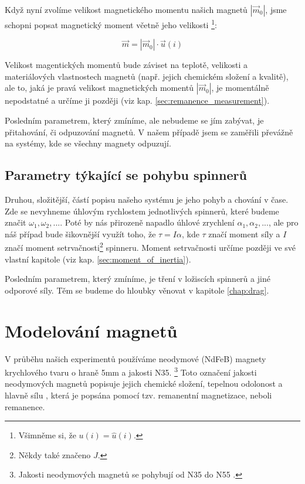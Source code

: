 \documentclass[12pt, a4paper,
 twoside,        %
 openright
]{report}
\begin{document}
{\raggedright
Když nyní zvolíme velikost magnetického momentu našich magnetů $|\vec{m}_0|$, jsme schopni popsat magnetický moment včetně jeho velikosti \footnote{Všimněme si, že $u(i) = \hat{u}(i)$.}:}

\begin{equation}
    \label{eq:magnet_moment_orientation}
    \vec{m} = |\vec{m}_0| \cdot \vec{u}(i)
\end{equation}

Velikost magentických momentů bude záviset na teplotě, velikosti a materiálových vlastnostech magnetů (např. jejich chemickém složení a kvalitě), ale to, jaká je pravá velikost magnetických momentů $|\vec{m}_0|$, je momentálně nepodstatné a určíme ji později (viz kap. \ref{sec:remanence_measurement}).

Posledním parametrem, který zmíníme, ale nebudeme se jím zabývat, je přitahování, či odpuzování magnetů.
V našem případě jsem se zaměřili převážně na systémy, kde se všechny magnety odpuzují.

\subsection{Parametry týkající se pohybu spinnerů}

Druhou, složitější, částí popisu našeho systému je jeho pohyb a chování v čase.
Zde se nevyhneme úhlovým rychlostem jednotlivých spinnerů, které budeme značit $\omega_1, \omega_2,...$.
Poté by nás přirozeně napadlo úhlové zrychlení $\alpha_1, \alpha_2, ...$, ale pro náš případ bude šikovnější využít toho, že $\tau = I\alpha$, kde $\tau$ značí moment síly a $I$ značí moment setrvačnosti\footnote{Někdy také značeno $J$.} spinneru.
Moment setrvačnosti určíme později ve své vlastní kapitole (viz kap. \ref{sec:moment_of_inertia}).

Posledním parametrem, který zmíníme, je tření v ložiscích spinnerů a jiné odporové síly.
Těm se budeme do hloubky věnovat v kapitole \ref{chap:drag}.

\clearpage

\section{Modelování magnetů}
V průběhu našich experimentů používáme neodymové (NdFeB) magnety krychlového tvaru o hraně 5mm a jakosti N35. \footnote{Jakosti neodymových magnetů se pohybují od N35 do N55 \cite{magnet_grades}.}
Toto označení jakosti neodymových magnetů popisuje jejich chemické složení, tepelnou odolonost a hlavně sílu \cite{magnet_grades}, která je popsána pomocí tzv. remanentní magnetizace, neboli remanence.
\end{document}
